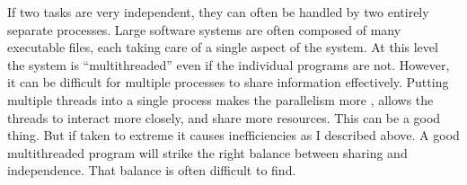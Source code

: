 If two tasks are very independent, they can often be handled by two entirely separate processes.
Large software systems are often composed of many executable files, each taking care of a single
aspect of the system. At this level the system is ``multithreaded'' even if the individual
programs are not. However, it can be difficult for multiple processes to share information
effectively. Putting multiple threads into a single process makes the parallelism more
, allows the threads to interact more closely, and share more resources.
This can be a good thing. But if taken to extreme it causes inefficiencies as I described above.
A good multithreaded program will strike the right balance between sharing and independence.
That balance is often difficult to find.
